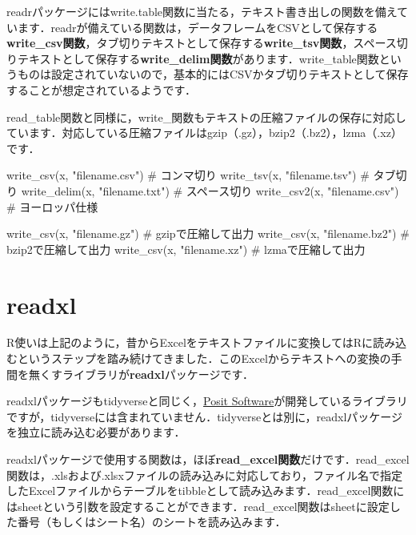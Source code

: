 \documentclass[
  letterpaper,
  DIV=11,
  numbers=noendperiod]{scrreprt}
\newenvironment{Shaded}{\begin{snugshade}}{\end{snugshade}}
\newcommand{\CommentTok}[1]{\textcolor[rgb]{0.37,0.37,0.37}{#1}}
\newcommand{\FunctionTok}[1]{\textcolor[rgb]{0.28,0.35,0.67}{#1}}
\newcommand{\NormalTok}[1]{\textcolor[rgb]{0.00,0.23,0.31}{#1}}
\newcommand{\StringTok}[1]{\textcolor[rgb]{0.13,0.47,0.30}{#1}}
\begin{document}
readrパッケージにはwrite.table関数に当たる，テキスト書き出しの関数を備えています．readrが備えている関数は，データフレームをCSVとして保存する\textbf{write\_csv関数}，タブ切りテキストとして保存する\textbf{write\_tsv関数}，スペース切りテキストとして保存する\textbf{write\_delim関数}があります．write\_table関数というものは設定されていないので，基本的にはCSVかタブ切りテキストとして保存することが想定されているようです．

read\_table関数と同様に，write\_関数もテキストの圧縮ファイルの保存に対応しています．対応している圧縮ファイルはgzip（.gz），bzip2（.bz2），lzma（.xz）です．

\begin{Shaded}
\begin{Highlighting}[]
\FunctionTok{write\_csv}\NormalTok{(x, }\StringTok{"filename.csv"}\NormalTok{) }\CommentTok{\# コンマ切り}
\FunctionTok{write\_tsv}\NormalTok{(x, }\StringTok{"filename.tsv"}\NormalTok{) }\CommentTok{\# タブ切り}
\FunctionTok{write\_delim}\NormalTok{(x, }\StringTok{"filename.txt"}\NormalTok{) }\CommentTok{\# スペース切り}
\FunctionTok{write\_csv2}\NormalTok{(x, }\StringTok{"filename.csv"}\NormalTok{) }\CommentTok{\# ヨーロッパ仕様}

\FunctionTok{write\_csv}\NormalTok{(x, }\StringTok{"filename.gz"}\NormalTok{) }\CommentTok{\# gzipで圧縮して出力}
\FunctionTok{write\_csv}\NormalTok{(x, }\StringTok{"filename.bz2"}\NormalTok{) }\CommentTok{\# bzip2で圧縮して出力}
\FunctionTok{write\_csv}\NormalTok{(x, }\StringTok{"filename.xz"}\NormalTok{) }\CommentTok{\# lzmaで圧縮して出力}
\end{Highlighting}
\end{Shaded}

\hypertarget{readxl}{%
\section{readxl}\label{readxl}}

R使いは上記のように，昔からExcelをテキストファイルに変換してはRに読み込むというステップを踏み続けてきました．このExcelからテキストへの変換の手間を無くすライブラリが\textbf{readxl}パッケージです．

readxlパッケージもtidyverseと同じく，\href{https://posit.co/}{Posit
Software}が開発しているライブラリですが，tidyverseには含まれていません．tidyverseとは別に，readxlパッケージを独立に読み込む必要があります．

readxlパッケージで使用する関数は，ほぼ\textbf{read\_excel関数}だけです．read\_excel関数は，.xlsおよび.xlsxファイルの読み込みに対応しており，ファイル名で指定したExcelファイルからテーブルをtibbleとして読み込みます．read\_excel関数にはsheetという引数を設定することができます．read\_excel関数はsheetに設定した番号（もしくはシート名）のシートを読み込みます．
\end{document}

